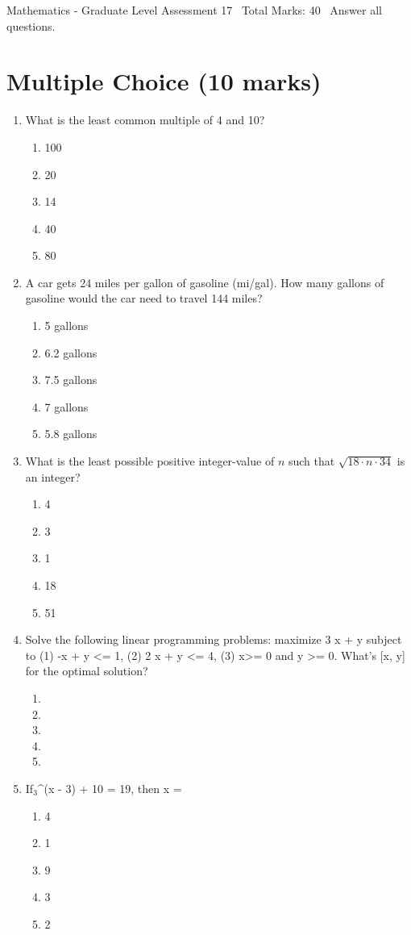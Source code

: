\documentclass[12pt]{article}
\begin{document}
\begin{center}
Mathematics - Graduate Level Assessment 17 \
Total Marks: 40 \
Answer all questions.
\end{center}

\section*{Multiple Choice (10 marks)}
\begin{enumerate}[label=\arabic*.]
\item What is the least common multiple of 4 and 10?
\begin{enumerate}[label=(\alph*)]
    \item 100
    \item 20
    \item 14
    \item 40
    \item 80
\end{enumerate}
\item A car gets 24 miles per gallon of gasoline (mi/gal). How many gallons of gasoline would the car need to travel 144 miles?
\begin{enumerate}[label=(\alph*)]
    \item 5 gallons
    \item 6.2 gallons
    \item 7.5 gallons
    \item 7 gallons
    \item 5.8 gallons
\end{enumerate}
\item What is the least possible positive integer-value of $n$ such that $\sqrt{18\cdot n \cdot 34}$ is an integer?
\begin{enumerate}[label=(\alph*)]
    \item 4
    \item 3
    \item 1
    \item 18
    \item 51
\end{enumerate}
\item Solve the following linear programming problems: maximize 3 x + y subject to (1) -x + y \textless{}= 1, (2) 2 x + y \textless{}= 4, (3) x\textgreater{}= 0 and y \textgreater{}= 0. What's [x, y] for the optimal solution?
\begin{enumerate}[label=(\alph*)]
    \item [1, 2]
    \item [0, 1]
    \item [1, 1]
    \item [4, 0]
    \item [3, 0]
\end{enumerate}
\item If$_{3}$^(x - 3) + 10 = 19, then x =
\begin{enumerate}[label=(\alph*)]
    \item 4
    \item 1
    \item 9
    \item 3
    \item 2
\end{enumerate}
\end{enumerate}
\end{document}
